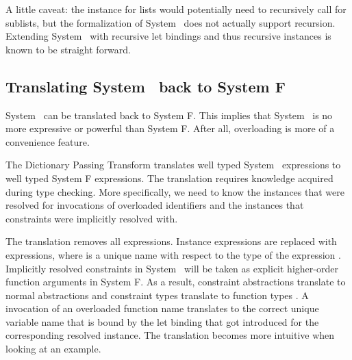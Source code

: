 \noindent A little caveat: the instance for lists would potentially need to recursively call  for sublists, but the formalization of System \Fo\ does not actually support recursion. 
Extending System \Fo\ with recursive let bindings and thus recursive instances is known to be straight forward. 

\subsection{Translating System \Fo\ back to System F}
System \Fo\ can be translated back to System F. 
This implies that System \Fo\ is no more expressive or powerful than System F. 
After all, overloading is more of a convenience feature. 

\noindent The Dictionary Passing Transform translates well typed System \Fo\ expressions to well typed System F expressions. 
The translation requires knowledge acquired during type checking. 
More specifically, we need to know the instances that were resolved for invocations of overloaded identifiers and the instances that constraints were implicitly resolved with.

\noindent The translation removes all \inl{|\Decl|}expressions. 
Instance expressions  are replaced with  expressions, where  is a unique name with respect to the type  of the expression . 
Implicitly resolved constraints in System \Fo\ will be taken as explicit higher-order function arguments in System F.
As a result, constraint abstractions  translate to normal abstractions  and constraint types  translate to function types . 
A invocation of an overloaded function name  translates to the correct unique variable name  that is bound by the let binding that got introduced for the corresponding resolved instance. 
The translation becomes more intuitive when looking at an example.

